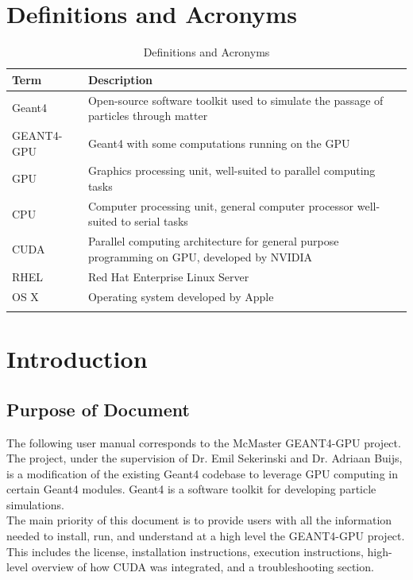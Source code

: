 \documentclass[12pt]{article}
\newcommand{\todo}[1]{\textcolor{red}{[TODO: #1]}} \else
\newcommand{\authornote}[3]{} \newcommand{\todo}[1]{} \fi
\newcommand{\ds}[1]{\authornote{blue}{DS}{#1}}
\newcommand{\sd}[1]{\authornote{green}{SD}{#1}}
\begin{document}
\ds{You should consider adding some figures (even just screenshots of console results)
	to add some variety to the document. It makes it easier to read.}
\sd{Added some figures}

\section{Definitions and Acronyms} %
\begin{table}[h]
\centering
\caption{Definitions and Acronyms}
\begin{tabularx}{\textwidth}{lX}
\toprule
\bf Term & \bf Description\\\midrule
Geant4 & Open-source software toolkit used to simulate the passage of particles through matter\\
GEANT4-GPU & Geant4 with some computations running on the GPU\\
GPU & Graphics processing unit, well-suited to parallel computing tasks\\
CPU & Computer processing unit, general computer processor well-suited to serial tasks\\
CUDA & Parallel computing architecture for general purpose programming on GPU, developed by NVIDIA\\
RHEL & Red Hat Enterprise Linux Server\\
OS X & Operating system developed by Apple\\
\Xhline{2\arrayrulewidth}
\end{tabularx}
\end{table}



\section{Introduction} %
\subsection{Purpose of Document} %
The following user manual corresponds to the McMaster GEANT4-GPU project. The project, under the supervision of Dr. Emil Sekerinski and Dr. Adriaan Buijs, is a modification of the existing Geant4 codebase to leverage GPU computing in certain Geant4 modules. Geant4 is a software toolkit for developing particle simulations.\\

The main priority of this document is to provide users with all the information needed to install, run, and understand at a high level the GEANT4-GPU project. This includes the license, installation instructions, execution instructions, high-level overview of how CUDA was integrated, and a troubleshooting section.
\end{document}
